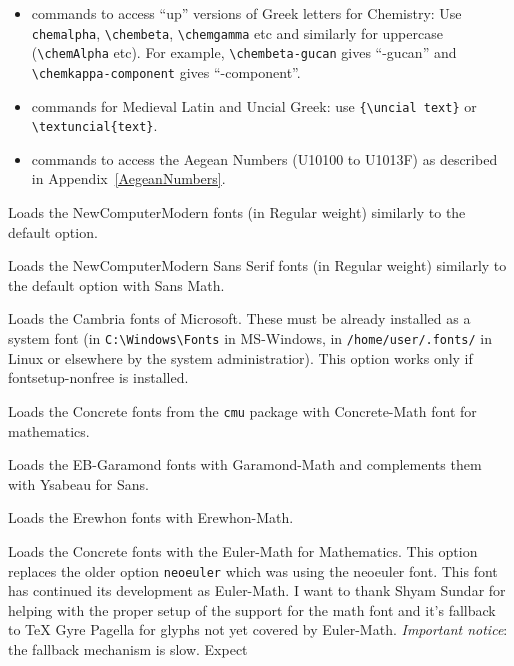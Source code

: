 \documentclass{book}
\newcommand\leftgrquotes{\char"201C}
\newcommand\rightgrquotes{\char"201E}
\begin{document}
\begin{description}
\begin{itemize}
\begin{center}
{\newcmgreekguillemots  «φώναζε: \leftgrquotes απ' έξω την προπαίδεια\rightgrquotes»· σαν εκδίκηση ακουγόταν\ldots}
\end{center}
For more information and references see the documentation of the
NewComputerModern font family.
      \item commands to access ``up'' versions of Greek letters for Chemistry: Use \verb|chemalpha|,
        \verb|\chembeta|, \verb|\chemgamma| etc and similarly for uppercase (\verb|\chemAlpha| etc).
        For example, \verb|\chembeta-gucan| gives ``\chembeta-gucan'' and \verb|\chemkappa-component|
        gives ``\chemkappa-component''.
      \item commands for Medieval Latin and Uncial Greek:
        use \verb|{\uncial text}| or \verb|\textuncial{text}|.
      \item commands to access the Aegean Numbers (U10100 to U1013F) as described in
        Appendix~\ref{AegeanNumbers}.
    \end{itemize}
  \item[olddefault] Loads the NewComputerModern fonts (in Regular weight)
    similarly to the default option.
  \item[sansdefault] Loads the NewComputerModern Sans Serif fonts (in Regular weight)
    similarly to the default option with Sans Math.
  \item[cambria] Loads the Cambria fonts of Microsoft. These must be already installed
    as a system font (in \verb|C:\Windows\Fonts| in MS-Windows, in \verb|/home/user/.fonts/| in Linux
    or elsewhere by the system administratior). This option works only if
    fontsetup-nonfree is installed.
  \item[concrete] Loads the Concrete fonts from the \texttt{cmu} package with Concrete-Math
    font for mathematics.
  \item[ebgaramond] Loads the EB-Garamond fonts with Garamond-Math and complements them with
    Ysabeau for Sans.
    \item[erewhon] Loads the Erewhon fonts with Erewhon-Math.
    \item[euler] Loads the Concrete fonts with the Euler-Math for Mathematics. This option replaces
      the older option \texttt{neoeuler} which was using the neoeuler font. This font has continued
      its development as Euler-Math. I want to thank Shyam Sundar for helping with the
      proper setup of the support for the math font and it's fallback to TeX Gyre Pagella for
      glyphs not yet covered by Euler-Math. \textit{Important notice}: the fallback mechanism is slow. Expect

\end{description}
\end{document}
